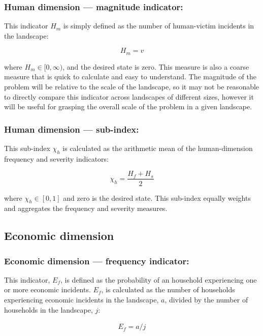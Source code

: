 \documentclass[fleqn,10pt]{olplainarticle}
\begin{document}
\subsubsection*{Human dimension --- magnitude indicator:}
This indicator $H_m$ is simply defined as the number of human-victim incidents in the landscape:

\begin{equation*}
    H_m = v
\end{equation*}

where $H_m \in [0,\infty)$, and the desired state is zero.
This measure is also a coarse measure that is quick to calculate and easy to understand. The magnitude of the problem will be relative to the scale of the landscape, so it may not be reasonable to directly compare this indicator across landscapes of different sizes, however it will be useful for grasping the overall scale of the problem in a given landscape.

\subsubsection*{Human dimension --- sub-index:}

This sub-index $\chi_h$ is calculated as the arithmetic mean of  the human-dimension frequency and severity indicators:

\begin{equation*}
    \chi_h = \frac{H_f + H_s}{2}
\end{equation*}

where $\chi_h \in [0,1]$ and zero is the desired state. This sub-index equally weights and aggregates the frequency and severity measures.

\subsection*{Economic dimension}

\subsubsection*{Economic dimension --- frequency indicator:}
This indicator, $E_f$, is defined as  the probability of an household experiencing one or more economic incidents. $E_f$, is calculated as the number of households experiencing economic incidents in the landscape, $a$, divided by the number of households in the landscape, $j$:

\begin{align*}
    E_f = a/j
\end{align*}
\end{document}
